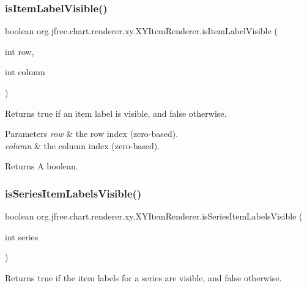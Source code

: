 \subsubsection{\texorpdfstring{is\+Item\+Label\+Visible()}{isItemLabelVisible()}}
{\footnotesize\ttfamily boolean org.\+jfree.\+chart.\+renderer.\+xy.\+X\+Y\+Item\+Renderer.\+is\+Item\+Label\+Visible (\begin{DoxyParamCaption}\item[{int}]{row,  }\item[{int}]{column }\end{DoxyParamCaption})}

Returns {\ttfamily true} if an item label is visible, and {\ttfamily false} otherwise.


\begin{DoxyParams}{Parameters}
{\em row} & the row index (zero-\/based). \\
\hline
{\em column} & the column index (zero-\/based).\\
\hline
\end{DoxyParams}
\begin{DoxyReturn}{Returns}
A boolean. 
\end{DoxyReturn}
\mbox{\label{interfaceorg_1_1jfree_1_1chart_1_1renderer_1_1xy_1_1_x_y_item_renderer_a29dbe1dc22ee0ca0c7bd5f8e55f89179}} 
\subsubsection{\texorpdfstring{is\+Series\+Item\+Labels\+Visible()}{isSeriesItemLabelsVisible()}}
{\footnotesize\ttfamily boolean org.\+jfree.\+chart.\+renderer.\+xy.\+X\+Y\+Item\+Renderer.\+is\+Series\+Item\+Labels\+Visible (\begin{DoxyParamCaption}\item[{int}]{series }\end{DoxyParamCaption})}

Returns {\ttfamily true} if the item labels for a series are visible, and {\ttfamily false} otherwise.


